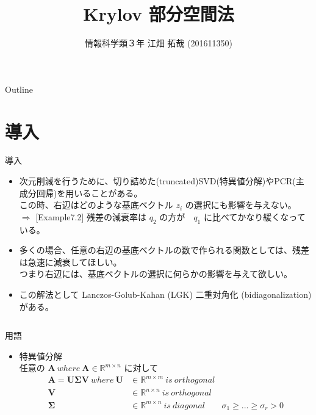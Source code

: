 \documentclass[dvipdfmx,10pt,presentation]{beamer}
\author{情報科学類３年 江畑 拓哉 (201611350)}
\date{}
\title{Krylov 部分空間法}
\begin{document}
\maketitle
\begin{frame}{Outline}
\tableofcontents
\end{frame}


\section{導入}
\label{sec:orgd5103e2}
\begin{frame}[allowframebreaks]{導入}
\begin{itemize}
\item 次元削減を行うために、切り詰めた(truncated)SVD(特異値分解)やPCR(主成分回帰)を用いることがある。\\
この時、右辺はどのような基底ベクトル \(z_i\) の選択にも影響を与えない。\\
\(\Rightarrow\) [Example7.2] 残差の減衰率は \(q_2\) の方が　\(q_1\) に比べてかなり緩くなっている。\\
\item 多くの場合、任意の右辺の基底ベクトルの数で作られる関数としては、残差は急速に減衰してほしい。\\
つまり右辺には、基底ベクトルの選択に何らかの影響を与えて欲しい。\\
\item この解法として Lanczos-Golub-Kahan (LGK) 二重対角化 (bidiagonalization) がある。\\
\end{itemize}
\begin{columns}
\begin{column}{1.00\columnwidth}
\begin{block}{用語}
\begin{itemize}
\item 特異値分解\\
任意の \(\bm{A}\ where\ \bm{A} \in \mathbb{R} ^{m \times n}\) に対して\\

\begin{align*}
\bm{A} = \bm{U} \bm{\Sigma} \bm{V}
\ where\ \bm{U} &\in \mathbb{R}^{m \times m}\ is\ orthogonal\\
 \bm{V} &\in \mathbb{R}^{n \times n}\ is\ orthogonal\\
 \bm{\Sigma} &\in \mathbb{R}^{m \times n}\ is\ diagonal
             & \sigma_1 \geq ... \geq \sigma_r > 0
\end{align*}


\end{itemize}
\end{block}
\end{column}
\end{columns}
\end{frame}
\end{document}

